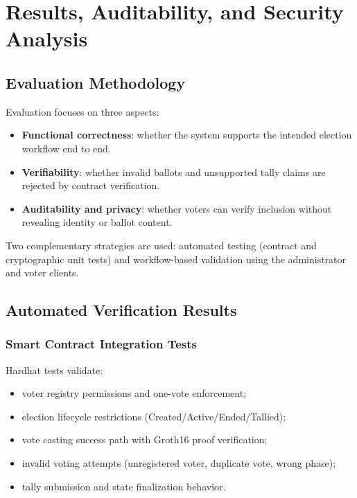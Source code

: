 \chapter{Results, Auditability, and Security Analysis}
\begingroup
\justifying
\setlength{\parindent}{0pt}
\setlength{\parskip}{0.5\baselineskip}
\titlespacing{\chapter}{0pt}{0pt}{0pt}
\titlespacing{\section}{0pt}{0pt}{0pt}

\section{Evaluation Methodology}

Evaluation focuses on three aspects:
\begin{itemize}
    \item \textbf{Functional correctness}: whether the system supports the intended election workflow end to end.
    \item \textbf{Verifiability}: whether invalid ballots and unsupported tally claims are rejected by contract verification.
    \item \textbf{Auditability and privacy}: whether voters can verify inclusion without revealing identity or ballot content.
\end{itemize}

Two complementary strategies are used: automated testing (contract and cryptographic unit tests) and workflow-based validation using the administrator and voter clients.

\section{Automated Verification Results}

\subsection{Smart Contract Integration Tests}

Hardhat tests validate:
\begin{itemize}
    \item voter registry permissions and one-vote enforcement;
    \item election lifecycle restrictions (Created/Active/Ended/Tallied);
    \item vote casting success path with Groth16 proof verification;
    \item invalid voting attempts (unregistered voter, duplicate vote, wrong phase);
    \item tally submission and state finalization behavior.
\end{itemize}

